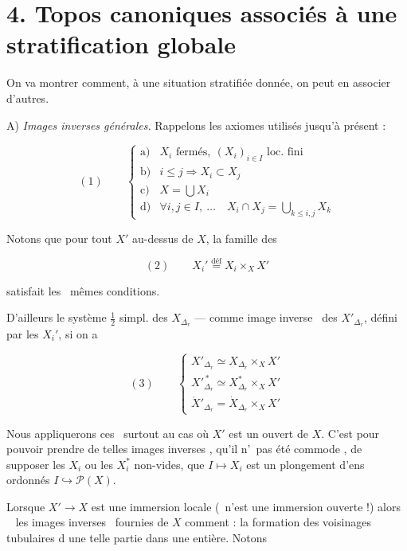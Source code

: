 \documentclass[11pt,a4paper]{article}
\begin{document}
\section*{4. Topos canoniques associés à une stratification globale}

On va montrer comment, à une situation stratifiée donnée, on peut en associer
d'autres.



A) \emph{Images inverses générales.} Rappelons les axiomes utilisés jusqu'à
présent :

\[
  (1) \qquad
  \begin{cases}
    \text{a)} & X_i \text{ fermés},\ (X_i)_{i \in I} \text{ loc. fini} \\
    \text{b)} & i \leq j \Rightarrow X_i \subset X_j \\
    \text{c)} & X = \bigcup X_i \\
    \text{d)} & \forall i,j \in I ,\ \ldots \quad
      X_i \cap X_j = \bigcup\limits_{k \leq i,j} X_k
  \end{cases}
\]

Notons que pour tout $X'$ au-dessus de $X$, la famille des

\[
  (2) \qquad X_i' \overset{\text{déf}}{=} X_i \times_X X'
\]


satisfait les \ill\ mêmes conditions.

D'ailleurs le système $\tfrac{1}{2}$ simpl. des $X_{\Delta_r}$ — comme image
inverse \ill\ des $X'_{\Delta_r}$, défini par les $X_i'$, si on a

\[
  (3) \qquad
  \begin{cases}
    X'_{\Delta_r} \simeq X_{\Delta_r} \times_X X' \\
    X'^{\,*}_{\Delta_r} \simeq X^{*}_{\Delta_r} \times_X X' \\
    \dot{X}'_{\Delta_r} = \dot{X}_{\Delta_r} \times_X X'
  \end{cases}
\]

 Nous appliquerons ces \ill\ surtout au cas où $X'$ est un ouvert
de $X$. C'est pour pouvoir prendre de telles images inverses \ill, qu'il
n'\ill\ pas été commode \ill, de supposer les $X_i$ ou les $X_i^{*}$ non-vides,
 que $I \mapsto X_i$ est un plongement d'ens ordonnés
$I \hookrightarrow \mathcal{P}(X)$.

Lorsque $X' \to X$ est une immersion locale  (\ill\ n'est une
immersion ouverte !) alors \ill\  les images inverses
\struck{\ill} \ill\ fournies de $X$ comment : la formation des voisinages
tubulaires d une telle partie dans une entière. Notons
\end{document}
